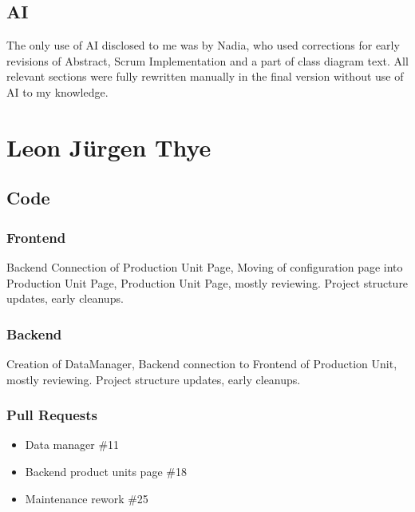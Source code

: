 \subsection*{AI}
The only use of AI disclosed to me was by Nadia, who used corrections for early revisions of Abstract, Scrum Implementation and a part of class diagram text. All relevant sections were fully rewritten manually in the final version without use of AI to my knowledge.

\section*{Leon Jürgen Thye}
\subsection*{Code}
\subsubsection*{Frontend}
Backend Connection of Production Unit Page, Moving of configuration page into Production Unit Page, Production Unit Page, mostly reviewing. Project structure updates, early cleanups.
\subsubsection*{Backend}
Creation of DataManager, Backend connection to Frontend of Production Unit, mostly reviewing. Project structure updates, early cleanups.
\subsubsection*{Pull Requests}
\begin{itemize}
    \item Data manager \#11
    \item Backend product units page \#18
    \item Maintenance rework \#25
\end{itemize}
